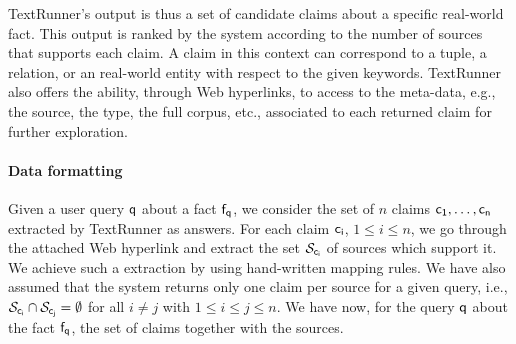 TextRunner's output is thus a set of candidate claims about a specific real-world fact.
This output is ranked by the system according to the number of sources that supports each
claim. A claim in this context can correspond to a tuple, a relation, or an real-world entity 
with respect to the given keywords. TextRunner also offers the ability, through Web hyperlinks, 
to access to the meta-data, e.g., the source, the type, the full corpus, etc., associated to each 
returned claim for further exploration. 

\paragraph*{Data formatting}
Given a user query $\mathsf{q}$ about a fact $\mathsf{f}_{\mathsf{q}}$, we consider the set of $n$ 
claims $\mathsf{c_{1}}, \ldots, \mathsf{c_{n}}$ extracted by TextRunner as answers. For each claim $\mathsf{c_{i}}$,
$1\leq i\leq n$, we go through the attached Web hyperlink and extract the set $\mathcal{S}_{\mathsf{c_{i}}}$ of 
sources which support it. We achieve such a extraction by using hand-written mapping rules. We have also
assumed that the system returns only one claim per source for a given query, i.e., $\mathcal{S}_{\mathsf{c_{i}}}
\cap \mathcal{S}_{\mathsf{c_{j}}}=\emptyset$ for all $i\neq j$ with $1\leq i\leq j\leq n$. We have now, for the query
$\mathsf{q}$ about the fact $\mathsf{f}_{\mathsf{q}}$, the set of claims together with the sources. 